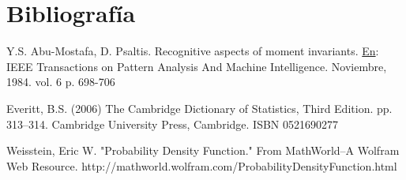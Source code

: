 \documentclass[a4paper, 11pt, oneside]{report}
\begin{document}

\chapter*{Bibliografía}
	
	Y.S. Abu-Mostafa, D. Psaltis. Recognitive aspects of moment invariants. \underline{En}: IEEE Transactions on Pattern Analysis And Machine Intelligence. Noviembre, 1984. vol. 6 p. 698-706

	Everitt, B.S. (2006) The Cambridge Dictionary of Statistics, Third Edition. pp. 313–314. Cambridge University Press, Cambridge. ISBN 0521690277

	Weisstein, Eric W. "Probability Density Function." From MathWorld--A Wolfram Web Resource. http://mathworld.wolfram.com/ProbabilityDensityFunction.html
\end{document}
